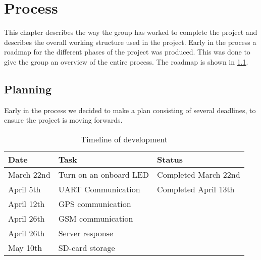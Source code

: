 
\chapter{Process}
This chapter describes the way the group has worked to complete the project and describes the overall working structure used in the project.
Early in the process a roadmap for the different phases of the project was produced. This was done to give the group an overview of the entire process. The roadmap is shown in \cref{tab:timeline}.

\section{Planning}
Early in the process we decided to make a plan consisting of several deadlines, to ensure the project is moving forwards.

\begin{table}[H]
	\begin{tabularx}{\textwidth}{l X X}
		\toprule
		Date & Task & Status \\
		\midrule
		March 22nd & Turn on an onboard LED & Completed March 22nd \\
		April 5th & UART Communication & Completed April 13th\\
		April 12th & GPS communication & \\
		April 26th & GSM communication & \\
		April 26th & Server response & \\
		May 10th & SD-card storage & \\
		\bottomrule
	\end{tabularx}
	\caption{Timeline of development}
	\label{tab:timeline}
\end{table}